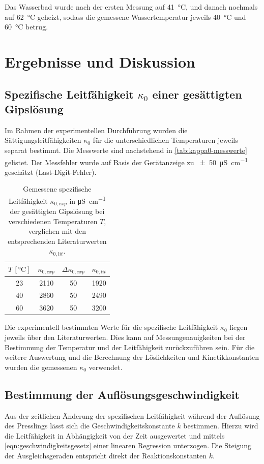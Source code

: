 Das Wasserbad wurde nach der ersten Messung auf \qty{41}{\degreeCelsius}, und danach nochmals auf \qty{62}{\degreeCelsius} geheizt, sodass die gemessene Wassertemperatur jeweils \qty{40}{\degreeCelsius} und \qty{60}{\degreeCelsius} betrug.

\section{Ergebnisse und Diskussion}
\subsection{Spezifische Leitfähigkeit $\kappa_0$ einer gesättigten Gipslösung}
Im Rahmen der experimentellen Durchführung wurden die Sättigungsleitfähigkeiten $\kappa_0$ für die unterschiedlichen Temperaturen jeweils separat bestimmt.
Die Messwerte sind nachstehend in \autoref{tab:kappa0-messwerte} gelistet. Der Messfehler wurde auf Basis der Gerätanzeige zu \qty{\pm 50}{\micro\siemens\per\cm} geschätzt (Last-Digit-Fehler).
\begin{table}[H]
    \centering
    \caption{Gemessene spezifische Leitfähigkeit $\kappa_{0,exp}$ in \unit{\micro\siemens\per\cm} der gesättigten Gipslösung bei verschiedenen Temperaturen $T$, verglichen mit den entsprechenden Literaturwerten $\kappa_{0,lit}$\autocite{skript-k4b}.}
    \begin{tabular}{c c c c}
       \toprule
        $T\, [\unit{\degreeCelsius}]$ & $\kappa_{0,exp}$ & $\Delta \kappa_{0,exp}$ & $\kappa_{0,lit}$ \\ \midrule
        23 & 2110 & \pm{} 50 & 1920 \\ \midrule
        40 & 2860 & \pm{} 50 & 2490 \\ \midrule
        60 & 3620 & \pm{} 50 & 3200 \\
       \bottomrule
    \end{tabular}
    \label{tab:kappa0-messwerte}
\end{table}

Die experimentell bestimmten Werte für die spezifische Leitfähigkeit $\kappa_0$ liegen jeweils über den Literaturwerten.
Dies kann auf Messungenauigkeiten bei der Bestimmung der Temperatur und der Leitfähigkeit zurückzuführen sein.
Für die weitere Auswertung und die Berechnung der Löslichkeiten und Kinetikkonstanten wurden die gemessenen $\kappa_0$ verwendet.

\subsection{Bestimmung der Auflösungsgeschwindigkeit}
Aus der zeitlichen Änderung der spezifischen Leitfähigkeit während der Auflösung des Presslings lässt sich die Geschwindigkeitskonstante $k$ bestimmen.
Hierzu wird die Leitfähigkeit in Abhängigkeit von der Zeit ausgewertet und mittels \autoref{eqn:geschwindigkeitsgesetz} einer linearen Regression unterzogen.
Die Steigung der Ausgleichsgeraden entspricht direkt der Reaktionskonstanten $k$.

